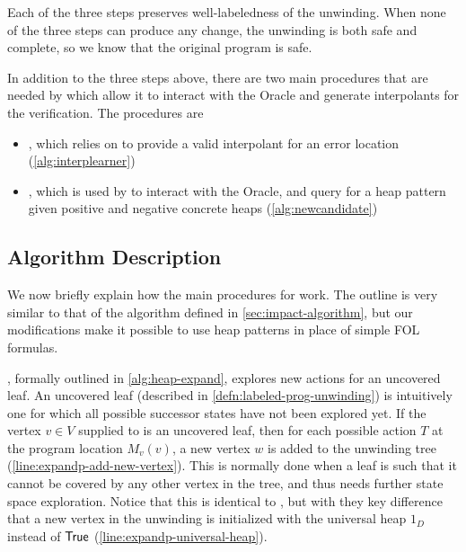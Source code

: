 Each of the three steps preserves well-labeledness of the unwinding. When none of the three steps can produce any change, the unwinding is both safe and complete, so we know that the original program is safe.

In addition to the three steps above, there are two main procedures that are needed by  which allow it to interact with the Oracle and generate interpolants for the verification. The procedures are

\begin{itemize}
  \item \seplearner, which  relies on to provide a valid interpolant for an error location (\autoref{alg:interplearner})
  \item \newcandidate, which is used by \seplearner to interact with the Oracle, and query for a heap pattern given positive and negative concrete heaps (\autoref{alg:newcandidate})
\end{itemize}

\subsection{Algorithm Description}
We now briefly explain how the main procedures for \verifier work. The outline is very similar to that of the \impact algorithm defined in \autoref{sec:impact-algorithm}, but our modifications make it possible to use heap patterns in place of simple FOL formulas.

\expandp, formally outlined in \autoref{alg:heap-expand}, explores new actions for an uncovered leaf. An uncovered leaf (described in \autoref{defn:labeled-prog-unwinding}) is intuitively one for which all possible successor states have not been explored yet. If the vertex $v \in V$ supplied to \expandp is an uncovered leaf, then for each possible action $T$ at the program location $M_v(v)$, a new vertex $w$ is added to the unwinding tree (\autoref{line:expandp-add-new-vertex}). This is normally done when a leaf is such that it cannot be covered by any other vertex in the tree, and thus needs further state space exploration. Notice that this is identical to \impact, but with they key difference that a new vertex in the unwinding is initialized with the universal heap $1_D$ instead of $\mathsf{True}$ (\autoref{line:expandp-universal-heap}).

